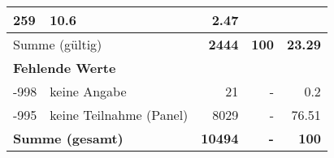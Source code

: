 \begin{longtable}{lXrrr}
       \num{259} &
       \num[round-mode=places,round-precision=2]{10,6} &
         \num[round-mode=places,round-precision=2]{2,47} \\
     \midrule
     \multicolumn{2}{l}{Summe (gültig)} &
       \textbf{\num{2444}} &
     \textbf{100} &
       \textbf{\num[round-mode=places,round-precision=2]{23,29}} \\
     \multicolumn{5}{l}{\textbf{Fehlende Werte}}\\
       -998 &
       keine Angabe &
         \num{21} &
        - &
         \num[round-mode=places,round-precision=2]{0,2} \\
       -995 &
       keine Teilnahme (Panel) &
         \num{8029} &
        - &
         \num[round-mode=places,round-precision=2]{76,51} \\
     \midrule
     \multicolumn{2}{l}{\textbf{Summe (gesamt)}} &
          \textbf{\num{10494}} &
        \textbf{-} &
        \textbf{100} \\
     \bottomrule
     \end{longtable}
     

